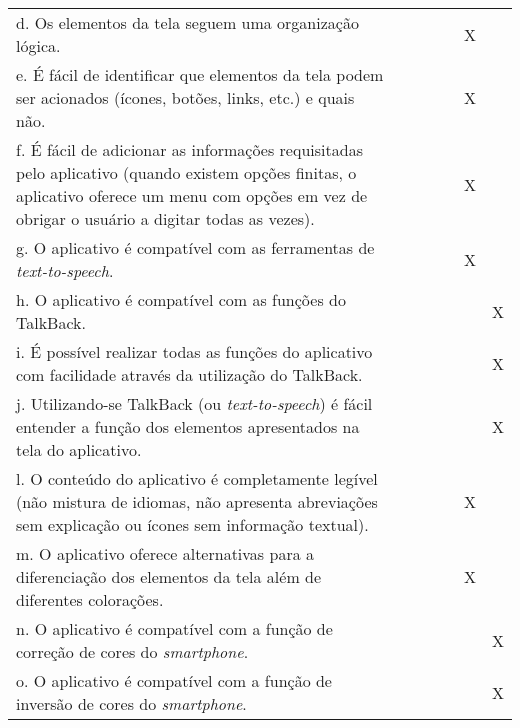 \documentclass[portuguese,oneside]{tcc}
\begin{document}
\begin{table}[h]
{\begin{tabu}{|L{25em}|c|c|c|c|c|c|}
							d. Os elementos da tela seguem uma organização lógica. & & & & & X & \\ 
							e. É fácil de identificar que elementos da tela podem ser acionados (ícones, botões, links, etc.) e quais não. & & & & & X & \\ 
							f. É fácil de adicionar as informações requisitadas pelo aplicativo (quando existem opções finitas, o aplicativo oferece um menu com opções em vez de obrigar o usuário a digitar todas as vezes). & & & & & X & \\ 
							g. O aplicativo é compatível com as ferramentas de \emph{text-to-speech}. & & & & & X & \\ 
							h. O aplicativo é compatível com as funções do TalkBack. & & & & & & X \\ 
							i. É possível realizar todas as funções do aplicativo com facilidade através da utilização do TalkBack.	& & & & & & X \\ 
							j. Utilizando-se TalkBack (ou \emph{text-to-speech}) é fácil entender a função dos elementos apresentados na tela do aplicativo. & & & & & & X \\ 
							l. O conteúdo do aplicativo é completamente legível (não mistura de idiomas, não apresenta abreviações sem explicação ou ícones sem informação textual). & & & & & X & \\ 
							m. O aplicativo oferece alternativas para a diferenciação dos elementos da tela além de diferentes colorações. & & & & & X & \\ 
							n. O aplicativo é compatível com a função de correção de cores do \emph{smartphone}. & & & & & & X \\ 
							o. O aplicativo é compatível com a função de inversão de cores do \emph{smartphone}. & & & & & & X \\ 
						\end{tabu}}
					\end{table}
					
\end{document}
